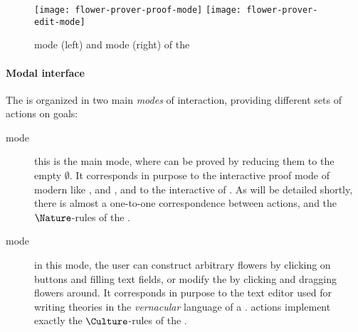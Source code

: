 \begin{scope}
\begin{figure*}
  \texttt{[image: flower-prover-proof-mode]}
  \hspace{1em}
  \texttt{[image: flower-prover-edit-mode]}
  \caption{\Proof mode (left) and \Edit mode (right) of the }
\end{figure*}

\paragraph{Modal interface}

The  is organized in two main \emph{modes} of interaction,
providing different sets of  actions on
goals:
\begin{description}
  \item[\Proof mode] this is the main mode, where  can be proved by
  reducing them to the empty  $\emptyset$. It corresponds in purpose to
  the interactive proof mode of modern  like ,  and
  , and to the interactive  of .
  As will be detailed shortly, there is almost a one-to-one correspondence
  between \Proof actions, and the $\Nature$-rules of the .
  
  \item[\Edit mode] in this mode, the user can construct arbitrary
  flowers by clicking on buttons and filling text fields, or modify the  by
  clicking and dragging flowers around. It corresponds in purpose to the text
  editor used for writing theories in the \emph{vernacular} language of a . \Edit actions implement exactly the
  $\Culture$-rules of the .
\end{description}


\end{scope}
